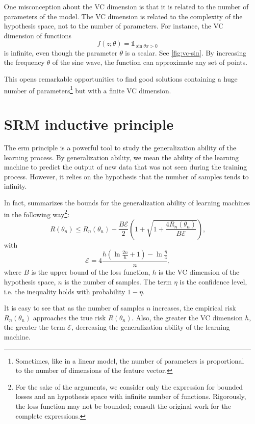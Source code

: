 One misconception about the VC dimension is that it is related to the number of parameters
of the model.  The VC dimension is related to the complexity of the hypothesis space, not
to the number of parameters.  For instance, the VC dimension of functions
\[
  f(z; \theta) = \mathbb{1}_{\sin \theta x > 0}
\]
is infinite, even though the parameter $\theta$ is a scalar.  See \cref{fig:vc-sin}.
By increasing the frequency $\theta$ of the sine wave, the function can approximate any set
of points.

This opens remarkable opportunities to find good solutions containing a huge number of
parameters\footnote{Sometimes, like in a linear model, the number of parameters is
proportional to the number of dimensions of the feature vector.} but with a finite VC
dimension.  %

\section{SRM inductive principle}

The \gls{erm} principle is a powerful tool to study the generalization ability of the
learning process.  By generalization ability, we mean the ability of the learning machine
to predict the output of new data that was not seen during the training process.  However,
it relies on the hypothesis that the number of samples tends to infinity.

In fact, \citeauthor{Vapnik1999b} summarizes the bounds for the
generalization ability of learning machines in the following way\footnote{ For the sake of
the arguments, we consider only the expression for bounded losses and an hypothesis space
with infinite number of functions.  Rigorously, the loss function may not be bounded;
consult the original work for the complete expressions.}:
\begin{equation}
  \label{eq:generalization-bound}
  R(\theta_n) \leq R_n(\theta_n) + \frac{B \mathcal{E}}{2} \left(
    1 + \sqrt{1 + \frac{4 R_n(\theta_n)}{B \mathcal{E}}}
  \right)\text{,}
\end{equation}
with
\[
  \mathcal{E} = 4 \frac{
    h \left( \ln \frac{2 n}{h} + 1 \right) - \ln \frac{\eta}{4}
  }{n}\text{,}
\]
where $B$ is the upper bound of the loss function, $h$ is the VC dimension of the
hypothesis space, $n$ is the number of samples.  The term $\eta$ is the confidence level,
i.e. the inequality holds with probability $1 - \eta$.

It is easy to see that as the number of samples $n$ increases, the empirical risk
$R_n(\theta_n)$ approaches the true risk $R(\theta_n)$.  Also, the greater the VC
dimension $h$, the greater the term $\mathcal{E}$, decreasing the generalization ability
of the learning machine.

